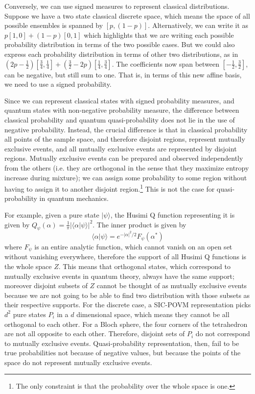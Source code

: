 \documentclass[10pt,twocolumn, nofootinbib]{revtex4-2}
\def\>{\rangle}
\begin{document}
Conversely, we can use signed measures to represent classical distributions. Suppose we have a two state classical discrete space, which means the space of all possible ensembles is spanned by $[p, (1-p)]$. Alternatively, we can write it as $p[1,0] + (1-p)[0,1]$ which highlights that we are writing each possible probability distribution in terms of the two possible cases. But we could also express each probability distribution in terms of other two distributions, as in $\left(2p - \frac{1}{2}\right)\left[\frac{3}{4}, \frac{1}{4}\right] + \left(\frac{3}{2} - 2p\right)\left[\frac{1}{4}, \frac{3}{4}\right]$. The coefficients now span between $\left[-\frac{1}{2}, \frac{3}{2}\right]$, can be negative, but still sum to one. That is, in terms of this new affine basis, we need to use a signed probability.

Since we can represent classical states with signed probability measures, and quantum states with non-negative probability measure, the difference between classical probability and quantum quasi-probability does not lie in the use of negative probability. Instead, the crucial difference is that in classical probability all points of the sample space, and therefore disjoint regions, represent mutually exclusive events, and all mutually exclusive events are represented by disjoint regions. Mutually exclusive events can be prepared and observed independently from the others (i.e. they are orthogonal in the sense that they maximize entropy increase during mixture); we can assign some probability to some region without having to assign it to another disjoint region.\footnote{The only constraint is that the probability over the whole space is one.} This is not the case for quasi-probability in quantum mechanics.

For example, given a pure state $|\psi\>$, the Husimi Q function representing it is given by $Q_\psi(\alpha) = \frac{1}{\pi} |\langle \alpha | \psi \rangle|^2$. The inner product is given by \cite[eq. 11.7-1]{mandel1995}
\begin{equation}
	\langle \alpha | \psi \rangle = e^{-|\alpha|^2/2} F_\psi(\alpha^\ast)
\end{equation}
where $F_\psi$ is an entire analytic function, which cannot vanish on an open set without vanishing everywhere, therefore the support of all Husimi Q functions is the whole space $Z$. This means that orthogonal states, which correspond to mutually exclusive events in quantum theory, always have the same support; moreover disjoint subsets of $Z$ cannot be thought of as mutually exclusive events because we are not going to be able to find two distribution with those subsets as their respective supports. For the discrete case, a SIC-POVM representation picks $d^2$ pure states $P_i$ in a $d$ dimensional space, which means they cannot be all orthogonal to each other. For a Bloch sphere, the four corners of the tetrahedron are not all opposite to each other. Therefore, disjoint sets of $P_i$ do not correspond to mutually exclusive events. Quasi-probability representation, then, fail to be true probabilities not because of negative values, but because the points of the space do not represent mutually exclusive events.
\end{document}
